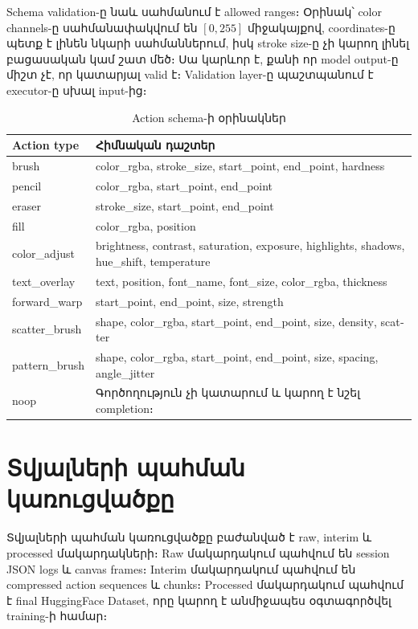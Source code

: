 \documentclass[12pt,a4paper]{report}
\newcommand{\Eng}[1]{\textenglish{#1}}
\begin{document}
Schema validation-ը նաև սահմանում է allowed ranges։ Օրինակ՝ color channels-ը սահմանափակվում են $[0,255]$ միջակայքով, coordinates-ը պետք է լինեն նկարի սահմաններում, իսկ stroke size-ը չի կարող լինել բացասական կամ շատ մեծ։ Սա կարևոր է, քանի որ model output-ը միշտ չէ, որ կատարյալ valid է։ Validation layer-ը պաշտպանում է executor-ը սխալ input-ից։

\begin{table}[H]
\caption{Action schema-ի օրինակներ}
\centering
\begin{tabularx}{\textwidth}{p{3.5cm}X}
\toprule
\textbf{Action type} & \textbf{Հիմնական դաշտեր} \\
\midrule
\Eng{brush} & \Eng{color\_rgba}, \Eng{stroke\_size}, \Eng{start\_point}, \Eng{end\_point}, \Eng{hardness} \\
\Eng{pencil} & \Eng{color\_rgba}, \Eng{start\_point}, \Eng{end\_point} \\
\Eng{eraser} & \Eng{stroke\_size}, \Eng{start\_point}, \Eng{end\_point} \\
\Eng{fill} & \Eng{color\_rgba}, \Eng{position} \\
\Eng{color\_adjust} & \Eng{brightness}, \Eng{contrast}, \Eng{saturation}, \Eng{exposure}, \Eng{highlights}, \Eng{shadows}, \Eng{hue\_shift}, \Eng{temperature} \\
\Eng{text\_overlay} & \Eng{text}, \Eng{position}, \Eng{font\_name}, \Eng{font\_size}, \Eng{color\_rgba}, \Eng{thickness} \\
\Eng{forward\_warp} & \Eng{start\_point}, \Eng{end\_point}, \Eng{size}, \Eng{strength} \\
\Eng{scatter\_brush} & \Eng{shape}, \Eng{color\_rgba}, \Eng{start\_point}, \Eng{end\_point}, \Eng{size}, \Eng{density}, \Eng{scatter} \\
\Eng{pattern\_brush} & \Eng{shape}, \Eng{color\_rgba}, \Eng{start\_point}, \Eng{end\_point}, \Eng{size}, \Eng{spacing}, \Eng{angle\_jitter} \\
\Eng{noop} & Գործողություն չի կատարում և կարող է նշել completion։ \\
\bottomrule
\end{tabularx}
\end{table}

\section{Տվյալների պահման կառուցվածքը}

Տվյալների պահման կառուցվածքը բաժանված է raw, interim և processed մակարդակների։ Raw մակարդակում պահվում են session JSON logs և canvas frames։ Interim մակարդակում պահվում են compressed action sequences և chunks։ Processed մակարդակում պահվում է final \Eng{HuggingFace Dataset}, որը կարող է անմիջապես օգտագործվել training-ի համար։
\end{document}
